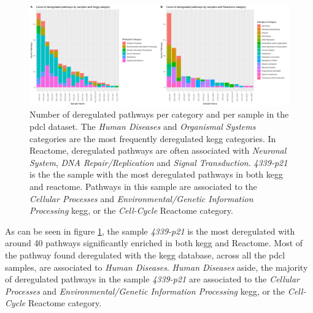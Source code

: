 \begin{figure}
    \includegraphics[width=\textwidth]{img/barplot-categ-pdcl}
    \caption{
        Number of deregulated pathways per category and per sample in the \acrshort{pdcl} dataset.
        The  \textit{Human Diseases} and \textit{Organismal Systems} categories are the most frequently deregulated \acrshort{kegg} categories.
        In Reactome, deregulated pathways are often associated with \textit{Neuronal System}, \textit{DNA Repair/Replication} and \textit{Signal Transduction}.
        \textit{4339-p21} is the the sample with the most deregulated pathways in both \acrshort{kegg} and reactome.
        Pathways in this sample are associated to the \textit{Cellular Processes} and \textit{Environmental/Genetic Information Processing} \acrshort{kegg}, or the \textit{Cell-Cycle} Reactome category.
    }
    \label{fig:barplot-categ-pdcl}
\end{figure}

As can be seen in figure \ref*{fig:barplot-categ-pdcl}, the sample \textit{4339-p21} is the most deregulated with around 40 pathways significantly enriched in both \acrshort{kegg} and Reactome.
Most of the pathway found deregulated with the \acrshort{kegg} database, across all the \acrshort{pdcl} samples, are associated to \textit{Human Diseases}.
\textit{Human Diseases} aside, the majority of deregulated pathways in the sample \textit{4339-p21} are associated to the \textit{Cellular Processes} and \textit{Environmental/Genetic Information Processing} \acrshort{kegg}, or the \textit{Cell-Cycle} Reactome category.

